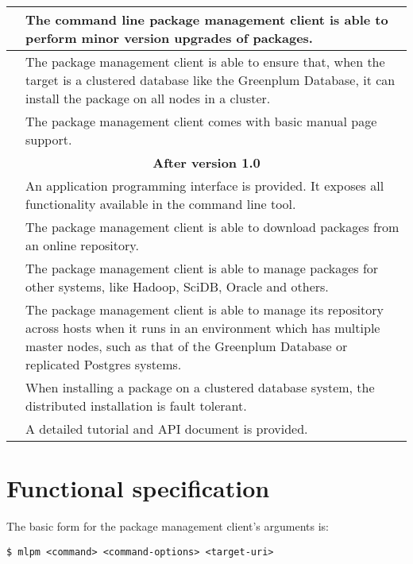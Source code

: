 \documentclass[11pt]{article}
\begin{document}
{\begin{mlreq}
\begin{tabular}{|l|p{133mm}|}
\hline
	\mlr & The command line package management client is able to perform
		   minor version upgrades of packages. \\

\hline
	\mlr & The package management client is able to ensure that, when the target
		   is a clustered database like the Greenplum Database, it can
		   install the package on all nodes in a cluster. \\
\hline
	\mlr & The package management client comes with basic manual page support.\\

\hline
	\multicolumn{2}{|c|}{\bf After version 1.0} \\
\hline
	\mlr & An application programming interface is provided. It exposes all
		   functionality available in the command line tool. \\
\hline
	\mlr & The package management client is able to download packages from an
		   online repository. \\
\hline
	\mlr & The package management client is able to manage packages for other
		   systems, like Hadoop, SciDB, Oracle and others. \\
\hline
	\mlr & The package management client is able to manage its repository across
		   hosts when it runs in an environment which has multiple master nodes,
		   such as that of the Greenplum Database or replicated Postgres
		   systems. \\
\hline
	\mlr & When installing a package on a clustered database system, the
		   distributed installation is fault tolerant. \\

\hline
	\mlr & A detailed tutorial and API document is provided. \\
\hline

\end{tabular}
\end{mlreq}

\ifx\pdfoutput\undefined %
\else
{}
\fi

\section{Functional specification}

	The basic form for the package management client's arguments is:

	\begin{lstlisting}
$ mlpm <command> <command-options> <target-uri>
	\end{lstlisting}

}
\end{document}
